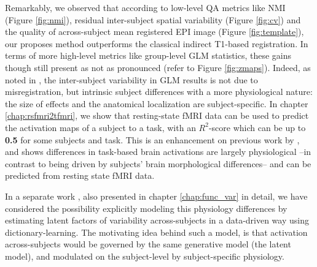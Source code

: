 Remarkably, we observed that according to low-level QA metrics
like NMI (Figure \ref{fig:nmi}), residual inter-subject spatial
variability (Figure \ref{fig:cv}) and the  quality of across-subject mean
registered EPI image (Figure \ref{fig:template}), our proposes method
outperforms the classical indirect T1-based registration.
%
In terms of more high-level metrics like group-level GLM statistics, these gains though still present as not as pronounced (refer to Figure \ref{fig:zmaps}). Indeed, as noted in
\citep{thirion2007analysis,pmid22425669,Xu2009}, the inter-subject variability
in GLM results is not due to misregistration, but intrinsic subject
differences with a more physiological nature: the size of effects and
the anatomical localization are subject-specific. In chapter \ref{chap:rsfmri2tfmri},
we show that resting-state fMRI data can be used to predict the activation maps of
a subject to a task, with an $R^2$-score which can be up to \textbf{0.5} for some subjects and task.
This is an enhancement on previous work by \citep{tavor2016task}, and shows
differences in task-based brain activations are largely physiological --in contrast to being driven
by subjects' brain morphological differences-- and can be predicted from resting state fMRI data.

In a separate work \citep{dohmatob2016}, also presented in chapter \ref{chap:func_var} in detail, we have considered the possibility explicitly
modeling this physiology differences by estimating latent
factors of variability across-subjects in a data-driven way using
dictionary-learning. The motivating idea behind such a model, is that activation
across-subjects would be governed by the same generative model (the latent model),
and modulated on the subject-level by
subject-specific physiology. 



